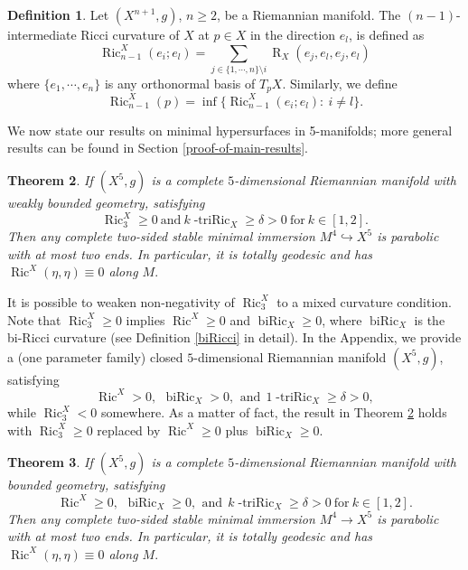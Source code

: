 \documentclass[11pt,letterpaper]{amsart}
\DeclareMathOperator{\Ric}{Ric}
\DeclareMathOperator{\biRic}{biRic}
\DeclareMathOperator{\R}{R}
\newtheorem{theorem}{Theorem}[section]
\theoremstyle{definition}
\newtheorem{definition}[theorem]{Definition}
\theoremstyle{remark}
\numberwithin{equation}{section}
\begin{document}
\begin{definition}\label{n-1intermediate}
    Let $(X^{n+1},g)$, $n\geq 2$, be a Riemannian manifold. The $(n-1)$-intermediate Ricci curvature of $X$ at $p\in X$ in the direction $e_l$,  is defined as
    \begin{equation*}
\Ric^X_{n-1}(e_i;e_l)=\sum_{j\in\{1,\cdots,n\}\setminus i} \R_X(e_j,e_l,e_j,e_l)
    \end{equation*}
    where $\{e_1,\cdots,e_n\}$ is any orthonormal basis of $T_pX$. Similarly, we define $$\Ric^X_{n-1}(p)=\inf\{\Ric^X_{n-1}(e_i;e_l): \ i\neq l\}.$$
\end{definition}


We now state our results on minimal hypersurfaces in 5-manifolds; more general results can be found in Section \ref{proof-of-main-results}.

\begin{theorem}\label{theorem1introduction}
    If $(X^5,g)$ is a complete $5$-dimensional Riemannian manifold with weakly bounded geometry, satisfying
    \[\operatorname{Ric}^X_3\geq 0\  \text{and} \ k\operatorname{-triRic}_X\geq \delta>0 \ \text{for}\ k\in[1,2]. \]
Then any complete two-sided  stable minimal immersion $M^4\hookrightarrow X^5$ is parabolic with at most two ends. In particular, it is totally geodesic and has $\operatorname{Ric}^X(\eta,\eta)\equiv 0$ along $M.$
\end{theorem}



 It is possible to weaken non-negativity of $\Ric_3^X$ to a mixed curvature condition. Note that $\Ric_3^X\geq 0$ implies $\Ric^X\geq 0$ and $\biRic_X\geq 0$, where $\biRic_X$ is the bi-Ricci curvature (see Definition \ref{biRicci} in detail). In the Appendix, we provide a (one parameter family) closed $5$-dimensional Riemannian manifold $(X^5,g)$, satisfying
    \[\operatorname{Ric}^X> 0,\ \, \biRic_X> 0,\ \, \text{and}\ \ 1\operatorname{-triRic}_X\geq \delta>0, \] while $\Ric^X_3<0$ somewhere. As a matter of fact, the result in Theorem \ref{theorem1introduction} holds with $\Ric_3^X\geq 0$ replaced by $\Ric^X\geq 0$ plus $\biRic_X\geq 0$.


\begin{theorem}\label{maintheorem1introduction}
    If $(X^5,g)$ is a complete $5$-dimensional Riemannian manifold with bounded geometry, satisfying
    \[\operatorname{Ric}^X\geq 0,\ \, \biRic_X\geq 0,\ \, \text{and}\ \ k\operatorname{-triRic}_X\geq \delta>0\ \text{for}\ k\in[1,2]. \]
Then any complete two-sided  stable minimal immersion $M^4\rightarrow X^5$ is parabolic with at most two ends. In particular, it is totally geodesic and has $\operatorname{Ric}^X(\eta,\eta)\equiv 0$ along $M.$
\end{theorem}
\end{document}
